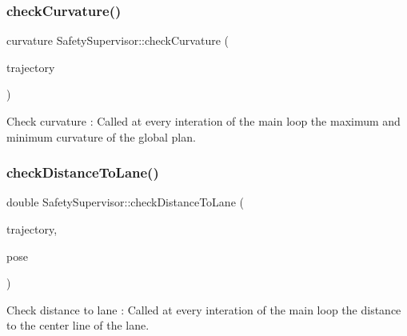 \mbox{\label{classSafetySupervisor_aa27392897deb93aae6f9e9599a36d8d6}} 
\subsubsection{\texorpdfstring{check\+Curvature()}{checkCurvature()}}
{\footnotesize\ttfamily curvature Safety\+Supervisor\+::check\+Curvature (\begin{DoxyParamCaption}\item[{const std\+::vector$<$ Planner\+H\+N\+S\+::\+Way\+Point $>$ \&}]{trajectory }\end{DoxyParamCaption})\hspace{0.3cm}{\ttfamily [inline]}}



Check curvature \+: Called at every interation of the main loop  the maximum and minimum curvature of the global plan. 

\mbox{\label{classSafetySupervisor_ab52d84e48d20ac021a579da62424c886}} 
\subsubsection{\texorpdfstring{check\+Distance\+To\+Lane()}{checkDistanceToLane()}}
{\footnotesize\ttfamily double Safety\+Supervisor\+::check\+Distance\+To\+Lane (\begin{DoxyParamCaption}\item[{const std\+::vector$<$ Planner\+H\+N\+S\+::\+Way\+Point $>$ \&}]{trajectory,  }\item[{const geometry\+\_\+msgs\+::\+Pose \&}]{pose }\end{DoxyParamCaption})\hspace{0.3cm}{\ttfamily [inline]}}



Check distance to lane \+: Called at every interation of the main loop  the distance to the center line of the lane. 

\mbox{\label{classSafetySupervisor_a23fbcc5b5a4f81f3a13cff623ce2c81f}} 
